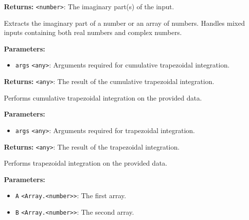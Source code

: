\documentclass[12pt,a4paper]{article}
\begin{document}
\noindent \textbf{Returns:} \texttt{<number>}: The imaginary part(s) of the input.

\noindent Extracts the imaginary part of a number or an array of numbers.
Handles mixed inputs containing both real numbers and complex numbers.

\vspace{5mm}
\noindent {}


\noindent \textbf{Parameters:}
\begin{itemize}
  \item \texttt{args} \texttt{<any>}: Arguments required for cumulative trapezoidal integration.
\end{itemize}

\noindent \textbf{Returns:} \texttt{<any>}: The result of the cumulative trapezoidal integration.

\noindent Performs cumulative trapezoidal integration on the provided data.

\vspace{5mm}
\noindent {}


\noindent \textbf{Parameters:}
\begin{itemize}
  \item \texttt{args} \texttt{<any>}: Arguments required for trapezoidal integration.
\end{itemize}

\noindent \textbf{Returns:} \texttt{<any>}: The result of the trapezoidal integration.

\noindent Performs trapezoidal integration on the provided data.

\vspace{5mm}
\noindent {}


\noindent \textbf{Parameters:}
\begin{itemize}
  \item \texttt{A} \texttt{<Array.<number>>}: The first array.
  \item \texttt{B} \texttt{<Array.<number>>}: The second array.
\end{itemize}
\end{document}
